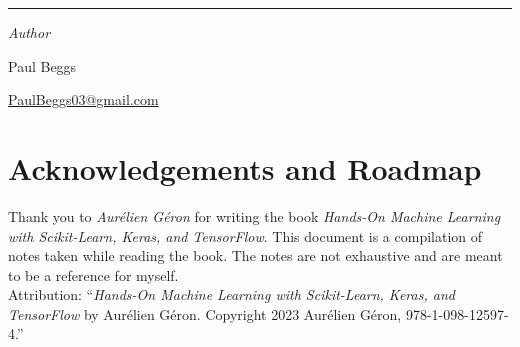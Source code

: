 \documentclass[12pt, oneside]{book}
\begin{document}
\begin{titlepage}
\begin{center}
        \vspace{2em}

        {\huge \textbf{\titlestandin}}

        \vspace{1em} %

        \textcolor{draculapink}{\rule{\textwidth}{1.0pt}}

        \vspace*{1\baselineskip}

        {\LARGE \textbf{\cussubtitle}}

        \begin{large}
            \vspace*{2\baselineskip}

            \emph{Author} \\[1ex]
            {\Large Paul Beggs \\ \par} %
            {\href{mailto:PaulBeggs03@gmail.com}{{PaulBeggs03@gmail.com}}}\\ %

        \end{large}
    \end{center}
\end{titlepage}
\pagebreak

\chapter*{Acknowledgements and Roadmap}

Thank you to \textit{Aurélien Géron} for writing the book \textit{Hands-On Machine Learning with Scikit-Learn, Keras, and TensorFlow}. This document is a compilation of notes taken while reading the book. The notes are not exhaustive and are meant to be a reference for myself. \\

Attribution: “\textit{Hands-On Machine Learning with Scikit-Learn, Keras, and TensorFlow} by Aurélien Géron. Copyright 2023 Aurélien Géron, 978-1-098-12597-4.” \\
\end{document}
